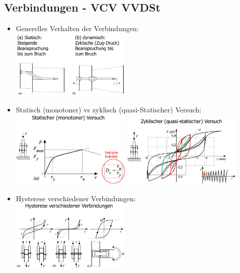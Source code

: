 \documentclass[fleqn,twoside]{article}
\begin{document}
        
    \subsection{Verbindungen - VCV VVDSt}
        \begin{itemize}
            \item Generelles Verhalten der Verbindungen:\\
                \includegraphics[width=0.45\textwidth]{Grafiken/Erdbeben/Verhalten Verbindungen.png}

            \item Statisch (monotoner) vs zyklisch (quasi-Statischer) Versuch:\\
                \includegraphics[width=0.45\textwidth]{Grafiken/Erdbeben/Statischer Versuch.png}
                \includegraphics[width=0.45\textwidth]{Grafiken/Erdbeben/Zyklischer Versuch.png}

            \item Hysterese verschiedener Verbindungen:\\
                \includegraphics[width=0.45\textwidth]{Grafiken/Erdbeben/Hysterese versch. Verbindungen.png}
        \end{itemize}
\end{document}

